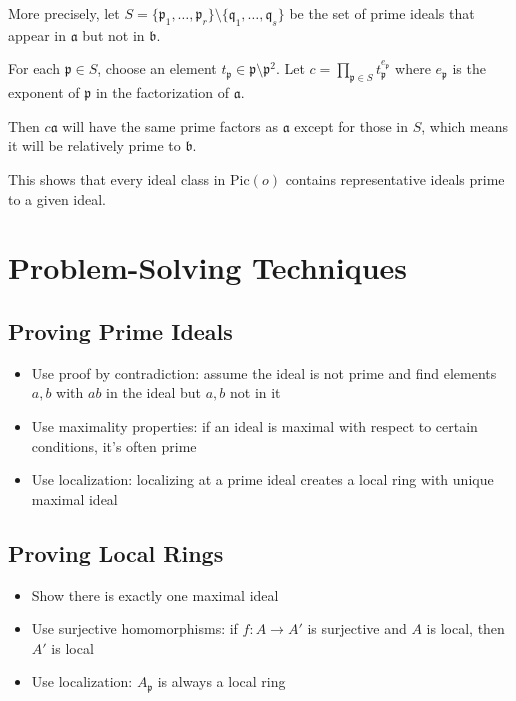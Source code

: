 More precisely, let $S = \{\mathfrak{p}_1, \ldots, \mathfrak{p}_r\} \setminus \{\mathfrak{q}_1, \ldots, \mathfrak{q}_s\}$ be the set of prime ideals that appear in $\mathfrak{a}$ but not in $\mathfrak{b}$.

For each $\mathfrak{p} \in S$, choose an element $t_{\mathfrak{p}} \in \mathfrak{p} \setminus \mathfrak{p}^2$. Let $c = \prod_{\mathfrak{p} \in S} t_{\mathfrak{p}}^{e_{\mathfrak{p}}}$ where $e_{\mathfrak{p}}$ is the exponent of $\mathfrak{p}$ in the factorization of $\mathfrak{a}$.

Then $c\mathfrak{a}$ will have the same prime factors as $\mathfrak{a}$ except for those in $S$, which means it will be relatively prime to $\mathfrak{b}$.

This shows that every ideal class in $\text{Pic}(o)$ contains representative ideals prime to a given ideal.

\section{Problem-Solving Techniques}


\subsection*{Proving Prime Ideals}
\begin{itemize}
\item Use proof by contradiction: assume the ideal is not prime and find elements $a, b$ with $ab$ in the ideal but $a, b$ not in it
\item Use maximality properties: if an ideal is maximal with respect to certain conditions, it's often prime
\item Use localization: localizing at a prime ideal creates a local ring with unique maximal ideal
\end{itemize}

\subsection*{Proving Local Rings}
\begin{itemize}
\item Show there is exactly one maximal ideal
\item Use surjective homomorphisms: if $f: A \rightarrow A'$ is surjective and $A$ is local, then $A'$ is local
\item Use localization: $A_{\mathfrak{p}}$ is always a local ring
\end{itemize}


